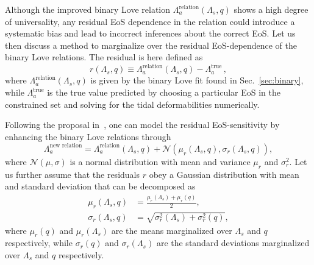 \documentclass[prd,twocolumn,nofootinbib,superscriptaddress,amsmath,amssymb]{revtex4-1}
\begin{document}
Although the improved binary Love relation $\Lambda_a^{\text{relation}}(\Lambda_s,q)$ shows a high degree of universality, any residual EoS dependence in the relation could introduce a systematic bias and lead to incorrect inferences about the correct EoS. Let us then discuss a method to marginalize over the residual EoS-dependence of the binary Love relations. The residual is here defined as 
\begin{equation}
\label{eq:residual}
r(\Lambda_{s},q) \equiv \Lambda_a^{\text{relation}}(\Lambda_s,q)-\Lambda_a^{\text{true}}\,,
\end{equation}
where $\Lambda_a^{\text{relation}}(\Lambda_s,q)$ is given by the binary Love fit found in Sec.~\ref{sec:binary}, while $\Lambda_a^{\text{true}}$ is the true value predicted by choosing a particular EoS in the constrained set and solving for the tidal deformabilities numerically. 

Following the proposal in~\cite{Katerina:residuals}, one can model the residual EoS-sensitivity by enhancing the binary Love relations through 
\begin{equation}
\Lambda_a^{{\textrm{new relation}}}=\Lambda_a^{\text{relation}}(\Lambda_s,q)+\mathcal{N}(\mu_{r}(\Lambda_s,q),\sigma_{r}(\Lambda_s,q)),
\end{equation}
where $\mathcal{N}(\mu,\sigma)$ is a normal distribution with mean and variance $\mu_{r}$ and $\sigma_{r}^2$. Let us further assume that the residuals $r$ obey a Gaussian distribution with mean and standard deviation that can be decomposed as
\begin{align}
\mu_{r}(\Lambda_s,q) &=\frac{\mu_{r}(\Lambda_s)+\mu_{r}(q)}{2},\\ 
\sigma_{r}(\Lambda_s,q) &=\sqrt{\sigma_{r}^2(\Lambda_s) + \sigma_{r}^2(q)},
\end{align}
where $\mu_{r}(q)$ and $\mu_{r}(\Lambda_{s})$ are the means marginalized over $\Lambda_{s}$ and $q$ respectively, while $\sigma_{r}(q)$ and $\sigma_{r}(\Lambda_{s})$ are the standard deviations marginalized over $\Lambda_{s}$ and $q$ respectively.
\end{document}

